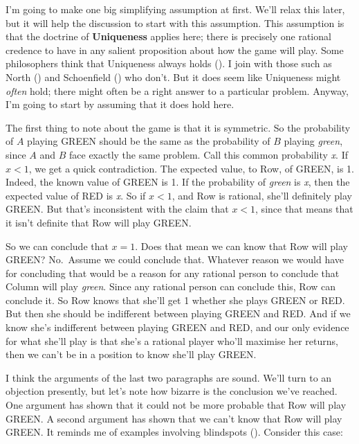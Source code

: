 \documentclass[
  11pt,
  letterpaper,
  DIV=11,
  numbers=noendperiod,
  twoside]{scrartcl}
\begin{document}
I'm going to make one big simplifying assumption at first. We'll relax
this later, but it will help the discussion to start with this
assumption. This assumption is that the doctrine of \textbf{Uniqueness}
applies here; there is precisely one rational credence to have in any
salient proposition about how the game will play. Some philosophers
think that Uniqueness always holds (). I join with those such as North ()
and Schoenfield () who don't. But it
does seem like Uniqueness might \emph{often} hold; there might often be
a right answer to a particular problem. Anyway, I'm going to start by
assuming that it does hold here.

The first thing to note about the game is that it is symmetric. So the
probability of \(A\) playing GREEN should be the same as the probability
of \(B\) playing \emph{green}, since \(A\) and \(B\) face exactly the
same problem. Call this common probability \emph{x}. If \(x < 1\), we
get a quick contradiction. The expected value, to Row, of GREEN, is 1.
Indeed, the known value of GREEN is 1. If the probability of
\emph{green} is \emph{x}, then the expected value of RED is \emph{x}. So
if \(x < 1\), and Row is rational, she'll definitely play GREEN. But
that's inconsistent with the claim that \(x < 1\), since that means that
it isn't definite that Row will play GREEN.

So we can conclude that \(x = 1\). Does that mean we can know that Row
will play GREEN? No.~Assume we could conclude that. Whatever reason we
would have for concluding that would be a reason for any rational person
to conclude that Column will play \emph{green}. Since any rational
person can conclude this, Row can conclude it. So Row knows that she'll
get 1 whether she plays GREEN or RED. But then she should be indifferent
between playing GREEN and RED. And if we know she's indifferent between
playing GREEN and RED, and our only evidence for what she'll play is
that she's a rational player who'll maximise her returns, then we can't
be in a position to know she'll play GREEN.

I think the arguments of the last two paragraphs are sound. We'll turn
to an objection presently, but let's note how bizarre is the conclusion
we've reached. One argument has shown that it could not be more probable
that Row will play GREEN. A second argument has shown that we can't know
that Row will play GREEN. It reminds me of examples involving blindspots
(). Consider this case:
\end{document}
